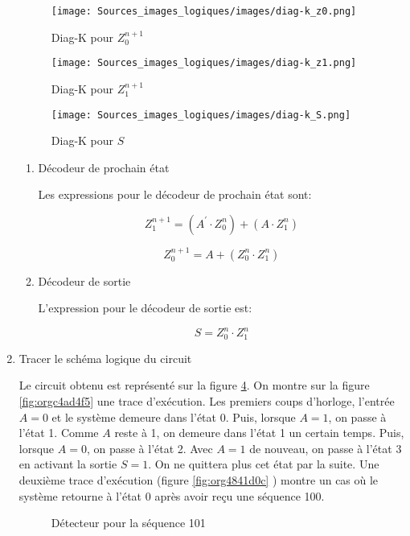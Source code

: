 \documentclass[11pt]{article}
\begin{document}
\begin{enumerate}
\begin{figure}[htbp]
\centering
\texttt{[image: Sources\_images\_logiques/images/diag-k\_z0.png]}
\caption{\label{fig:org8bb062b}Diag-K pour \(Z_0^{n+1}\)}
\end{figure}

\begin{figure}[htbp]
\centering
\texttt{[image: Sources\_images\_logiques/images/diag-k\_z1.png]}
\caption{\label{fig:org1281280}Diag-K pour \(Z_1^{n+1}\)}
\end{figure}

\begin{figure}[htbp]
\centering
\texttt{[image: Sources\_images\_logiques/images/diag-k\_S.png]}
\caption{\label{fig:orgbe671a1}Diag-K pour \(S\)}
\end{figure}

\begin{enumerate}
\item Décodeur de prochain état
\label{sec:orgcf31267}

Les expressions pour le décodeur de prochain état sont:

$$ Z_1^{n+1} = (A^\prime \cdot Z_0^{n}) + (A \cdot  Z_1^{n}) $$

$$ Z_0^{n+1} = A + (Z_0^{n} \cdot Z_1^{n}) $$

\item Décodeur de sortie
\label{sec:org5dccca0}

L'expression pour le décodeur de sortie est:

$$ S = Z_0^{n} \cdot Z_1^{n} $$
\end{enumerate}

\item Tracer le schéma logique du circuit
\label{sec:org16432ea}

Le circuit obtenu est représenté sur la figure
\ref{fig:orgf167b52}. On montre sur la figure
\ref{fig:orgc4ad4f5} une trace d'exécution. Les premiers coups
d'horloge, l'entrée \(A=0\) et le système demeure dans l'état 0. Puis,
lorsque \(A=1\), on passe à l'état 1. Comme \(A\) reste à 1, on
demeure dans l'état 1 un certain temps. Puis, lorsque \(A=0\), on
passe à l'état 2. Avec \(A=1\) de nouveau, on passe à l'état 3 en
activant la sortie \(S=1\). On ne quittera plus cet état par la
suite. Une deuxième trace d'exécution (figure \ref{fig:org4841d0c}
) montre un cas où le système retourne à l'état 0 après avoir reçu une
séquence 100.

\begin{figure}[htbp]
\centering

\caption{\label{fig:orgf167b52}Détecteur pour la séquence 101}
\end{figure}


\end{enumerate}
\end{document}
